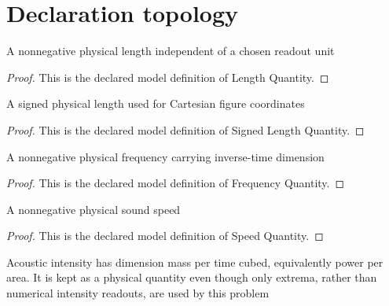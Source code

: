 \section{Declaration topology}
\begin{definition}
  \label{def:physics:phyx-mini-0219:phyxminiproblems-problemphyxmini0219-lengthquantity}
  A nonnegative physical length independent of a chosen readout unit
\end{definition}
\begin{proof}
  This is the declared model definition of Length Quantity.
\end{proof}
\begin{definition}
  \label{def:physics:phyx-mini-0219:phyxminiproblems-problemphyxmini0219-signedlengthquantity}
  A signed physical length used for Cartesian figure coordinates
\end{definition}
\begin{proof}
  This is the declared model definition of Signed Length Quantity.
\end{proof}
\begin{definition}
  \label{def:physics:phyx-mini-0219:phyxminiproblems-problemphyxmini0219-frequencyquantity}
  A nonnegative physical frequency carrying inverse-time dimension
\end{definition}
\begin{proof}
  This is the declared model definition of Frequency Quantity.
\end{proof}
\begin{definition}
  \label{def:physics:phyx-mini-0219:phyxminiproblems-problemphyxmini0219-speedquantity}
  A nonnegative physical sound speed
\end{definition}
\begin{proof}
  This is the declared model definition of Speed Quantity.
\end{proof}
\begin{definition}
  \label{def:physics:phyx-mini-0219:phyxminiproblems-problemphyxmini0219-acousticintensityquantity}
  Acoustic intensity has dimension mass per time cubed, equivalently power per area. It is kept as a physical quantity even though only extrema, rather than numerical intensity readouts, are used by this problem
\end{definition}
